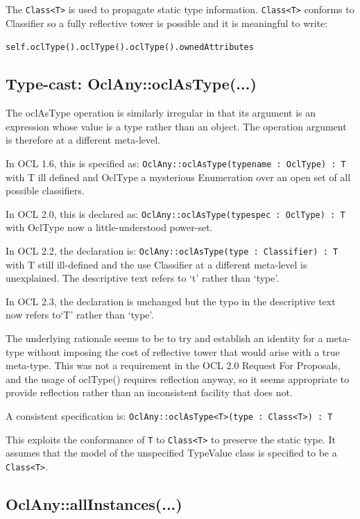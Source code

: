\documentclass{eceasst}
\begin{document}
The \verb!Class<T>! is used to propagate static type information. \verb!Class<T>! conforms to Classifier so a fully reflective tower is possible and it is meaningful to write:

 \verb!self.oclType().oclType().oclType().ownedAttributes!

\subsection{Type-cast: OclAny::oclAsType(...)}

The oclAsType operation is similarly irregular in that its argument is an expression whose value is a type rather than an object. The operation argument is therefore at a different meta-level.

In OCL 1.6, this is specified as: \verb!OclAny::oclAsType(typename : OclType) : T!  with T ill defined and OclType a mysterious Enumeration over an open set of all possible classifiers.

In OCL 2.0, this is declared as: \verb!OclAny::oclAsType(typespec : OclType) : T! with OclType now a little-understood power-set.

In OCL 2.2, the declaration is: \verb!OclAny::oclAsType(type : Classifier) : T! with T still ill-defined and the use Classifier at a different meta-level is unexplained. The descriptive text refers to `t' rather than `type'.

In OCL 2.3, the declaration is unchanged but the typo in the descriptive text now refers to`T' rather than `type'.

The underlying rationale seems to be to try and establish an identity for a meta-type without imposing the cost of reflective tower that would arise with a true meta-type. This was not a requirement in the OCL 2.0 Request For Proposals\cite{OCL-RFP}, and the usage of oclType() requires reflection anyway, so it seems appropriate to provide reflection rather than an inconsistent facility that does not.

A consistent specification is: \verb!OclAny::oclAsType<T>(type : Class<T>) : T!

This exploits the conformance of \verb!T! to \verb!Class<T>! to preserve the static type. It assumes that the model of the unspecified TypeValue class is specified to be a \verb!Class<T>!. 

\subsection{OclAny::allInstances(...)}
\end{document}
